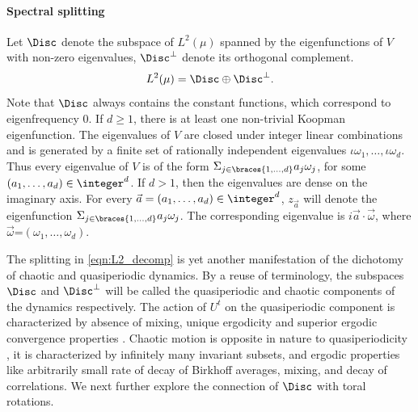 \documentclass[12pt,oneside]{article}
\begin{document}
\paragraph{Spectral splitting} Let $\Disc$ denote the subspace of $L^2(\mu)$ spanned by the eigenfunctions of $V$ with non-zero eigenvalues, $\Disc^\bot$ denote its orthogonal complement. 
%
\begin{equation} \label{eqn:L2_decomp}
L^2(\mu)=\Disc\oplus\Disc^\bot.
\end{equation}
%
Note that $\Disc$ always contains the constant functions, which correspond to eigenfrequency $0$. If $d\geq 1$, there is at least one non-trivial Koopman eigenfunction. The eigenvalues of $V$ are closed under integer linear combinations and is generated by a finite set of rationally independent eigenvalues $\iota \omega_1,\ldots,\iota \omega_d$. Thus every eigenvalue of $V$ is of the form $\Sigma_{j\in\braces{ 1, \ldots, d}}a_j \omega_j$, for some $(a_1,\ldots,a_d)\in\integer^d$. If $d>1$, then the eigenvalues are dense on the imaginary axis. For every $\vec{a}=(a_1,\ldots,a_d)\in\integer^d$, $z_{\vec{a}}$ will denote the eigenfunction $\Sigma_{j\in\braces{ 1, \ldots, d}}a_j \omega_j$. The corresponding eigenvalue is $i\vec{a}\cdot\vec{\omega}$, where $\vec{\omega}$=$(\omega_1,\ldots,\omega_d)$.

The splitting in \eqref{eqn:L2_decomp} is yet another manifestation of the dichotomy of chaotic and quasiperiodic dynamics. By a reuse of terminology, the subspaces $\Disc$ and $\Disc^\bot$ will be called the quasiperiodic and chaotic components of the dynamics respectively. The action of $U^t$ on the quasiperiodic component is characterized by absence of mixing, unique ergodicity and superior ergodic convergence properties \cite[e.g.]{DasJim2017_SuperC,DSSY2017_QQ,DasYorkeQuasiR2016}. Chaotic motion is opposite in nature to quasiperiodicity \cite[e.g.]{DasJim17_chaos,DasToungue2018,Blender2}, it is characterized by infinitely many invariant subsets, and ergodic properties like arbitrarily small rate of decay of Birkhoff averages, mixing, and decay of correlations. We next further explore the connection of $\Disc$ with toral rotations. 
\end{document}
